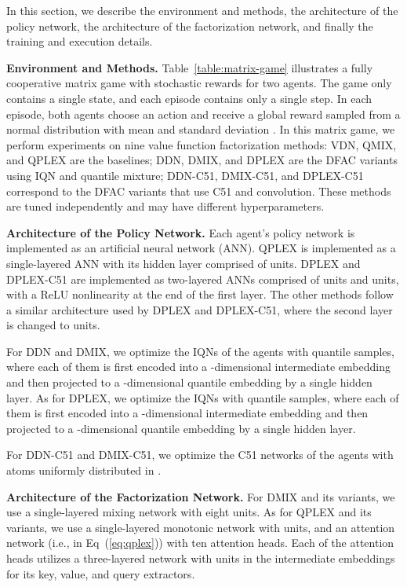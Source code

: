 \documentclass[twoside,11pt]{article}
\newcommand{\dmix}{DMIX}
\begin{document}
In this section, we describe the environment and methods, the architecture of the policy network, the architecture of the factorization network, and finally the training and execution details.

\textbf{Environment and Methods.}
Table~\ref{table:matrix-game} illustrates a fully cooperative matrix game with stochastic rewards for two agents. The game only contains a single state, and each episode contains only a single step. In each episode, both agents choose an action and receive a global reward sampled from a normal distribution  with mean  and standard deviation .
In this matrix game, we perform experiments on nine value function factorization methods: VDN, QMIX, and QPLEX are the baselines; DDN, DMIX, and DPLEX are the DFAC variants using IQN and quantile mixture; DDN-C51, DMIX-C51, and DPLEX-C51 correspond to the DFAC variants that use C51 and convolution. These methods are tuned independently and may have different hyperparameters.

\textbf{Architecture of the Policy Network.}
Each agent's policy network is implemented as an artificial neural network (ANN). QPLEX is implemented as a single-layered ANN with its hidden layer comprised of  units. DPLEX and DPLEX-C51 are implemented as two-layered ANNs comprised of  units and  units, with a ReLU nonlinearity at the end of the first layer. The other methods follow a similar architecture used by DPLEX and DPLEX-C51, where the second layer is changed to  units.

For DDN and DMIX, we optimize the IQNs of the agents with  quantile samples, where each of them is first encoded into a -dimensional intermediate embedding and then projected to a -dimensional quantile embedding by a single hidden layer. As for DPLEX, we optimize the IQNs with  quantile samples, where each of them is first encoded  into a -dimensional intermediate embedding and then projected to a -dimensional quantile embedding by a single hidden layer.

For DDN-C51 and DMIX-C51, we optimize the C51 networks of the agents with  atoms uniformly distributed in .

\textbf{Architecture of the Factorization Network.}
For \dmix{} and its variants, we use a single-layered mixing network with eight units. As for QPLEX and its variants, we use a single-layered monotonic network with  units, and an attention network  (i.e., in Eq~(\ref{eq:qplex})) with ten attention heads. Each of the attention heads utilizes a three-layered network with  units in the intermediate embeddings for its key, value, and query extractors.
\end{document}
